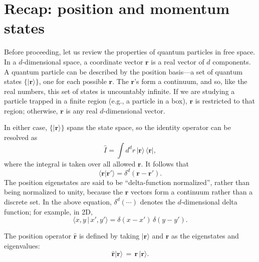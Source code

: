 \documentclass[pra,12pt]{revtex4}
\begin{document}
\section{Recap: position and momentum states}

Before proceeding, let us review the properties of quantum particles
in free space.  In a $d$-dimensional space, a coordinate vector
$\mathbf{r}$ is a real vector of $d$ components.  A quantum particle
can be described by the position basis---a set of quantum states
$\{|\mathbf{r}\rangle\}$, one for each possible $\mathbf{r}$.  The
$\mathbf{r}$'s form a continuum, and so, like the real numbers, this
set of states is uncountably infinite.  If we are studying a particle
trapped in a finite region (e.g., a particle in a box), $\mathbf{r}$
is restricted to that region; otherwise, $\mathbf{r}$ is any real
$d$-dimensional vector.

In either case, $\{|\mathbf{r}\rangle\}$ spans the state space, so the
identity operator can be resolved as
\begin{equation}
  \hat{I} = \int d^dr \, |\mathbf{r}\rangle \,\langle\mathbf{r}|,
\end{equation}
where the integral is taken over all allowed $\mathbf{r}$.  It
follows that
\begin{equation}
  \langle \mathbf{r} | \mathbf{r}' \rangle = \delta^d(\mathbf{r}-\mathbf{r}').
\end{equation}
The position eigenstates are said to be ``delta-function normalized'',
rather than being normalized to unity, because the $\mathbf{r}$
vectors form a continuum rather than a discrete set.  In the above
equation, $\delta^d(\cdots)$ denotes the $d$-dimensional delta
function; for example, in 2D,
\begin{equation}
  \langle x,y \,|\, x',y' \rangle = \delta(x-x') \, \delta(y-y').
\end{equation}

The position operator $\hat{\mathbf{r}}$ is defined by taking
$|\mathbf{r}\rangle$ and $\mathbf{r}$ as the eigenstates and
eigenvalues:
\begin{equation}
  \hat{\mathbf{r}} |\mathbf{r}\rangle \,=\, \mathbf{r}\, |\mathbf{r}\rangle.
\end{equation}
\end{document}
